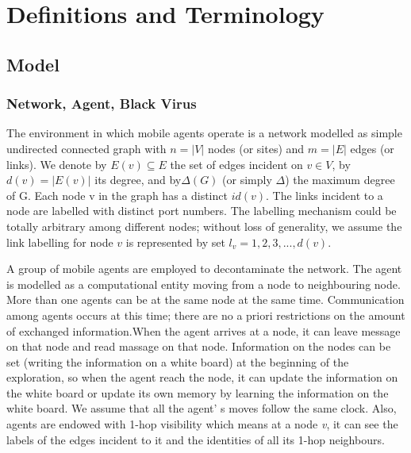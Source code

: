 \chapter {Definitions and Terminology}
\label{PM}
\section{Model}
\subsection{Network, Agent, Black Virus}

 The environment in which mobile agents operate is a network modelled as simple undirected connected graph with $n = \left |V\right |$ nodes (or sites) and $m = \left |E\right |$ edges (or links). We denote by $E (v)\subseteq E$ the set of edges incident on $v\in V$, by $d (v) = \left|E (v)\right|$ its degree, and by$\Delta(G)$ (or simply $\Delta$) the maximum degree of G. Each node v in the graph has a distinct $id(v)$. The links incident to a node are labelled with distinct port numbers. The labelling mechanism could be totally arbitrary among different nodes; without loss of generality, we assume the link labelling for node $v$ is represented by set $l_v =1,2,3,...,d(v)$. 

 A group of mobile agents are employed to decontaminate the network. The agent is modelled as a computational entity moving from a node to neighbouring node. More than one agents can be at the same node at the same time. Communication among agents occurs at this time; there are no a priori restrictions on the amount of exchanged information.When the agent arrives at a node, it can leave message on that node and read massage on that node. Information on the nodes can be set (writing the information on a white board) at the beginning of the exploration, so when the agent reach the node, it can update the information on the white board or update its own memory by learning the information on the white board.  We assume that all the agent' s moves follow the same clock. Also, agents are endowed with 1-hop visibility which means at a node {\em v}, it can see the labels of the edges incident to it and the identities of all its 1-hop neighbours. 


